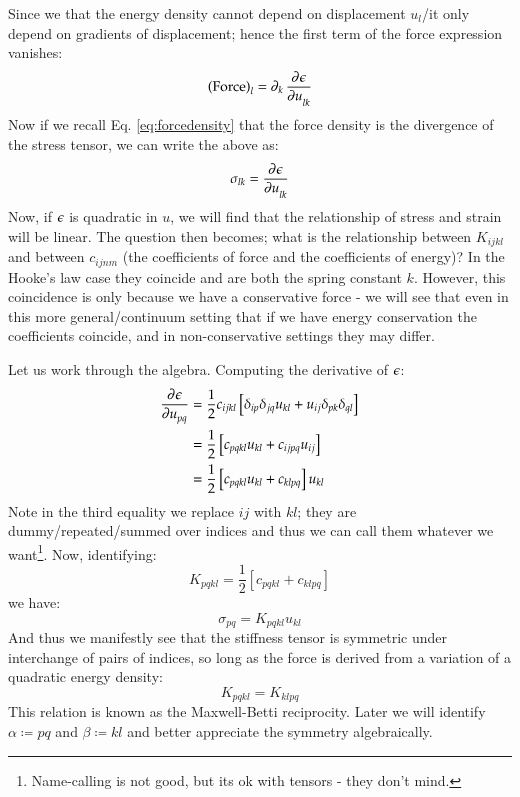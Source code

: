 Since we that the energy density cannot depend on displacement $u_l$/it only depend on gradients of displacement; hence the first term of the force expression vanishes:
\begin{equation}
    \left(\text{Force}\right)_l = \p_k \dpd{\e}{u_{lk}}
\end{equation}
Now if we recall Eq. \eqref{eq:forcedensity} that the force density is the divergence of the stress tensor, we can write the above as:
\begin{equation}
    \sigma_{lk} = \dpd{\e}{u_{lk}}
\end{equation}
Now, if $\epsilon$ is quadratic in $u$, we will find that the relationship of stress and strain will be linear. The question then becomes; what is the relationship between $K_{ijkl}$ and between $c_{ijnm}$ (the coefficients of force and the coefficients of energy)? In the Hooke's law case they coincide and are both the spring constant $k$. However, this coincidence is only because we have a conservative force - we will see that even in this more general/continuum setting that if we have energy conservation the coefficients coincide, and in non-conservative settings they may differ.

Let us work through the algebra. Computing the derivative of $\epsilon$:
\begin{equation}
    \begin{split}
        \dpd{\e}{u_{pq}} &= \frac{1}{2}c_{ijkl}\left[\delta_{ip}\delta_{jq}u_{kl} + u_{ij}\delta_{pk}\delta_{ql}\right] 
        \\ &= \frac{1}{2}\left[c_{pqkl}u_{kl} + c_{ijpq}u_{ij}\right]
        \\ &= \frac{1}{2}\left[c_{pqkl}u_{kl} + c_{klpq}\right]u_{kl}
    \end{split}
\end{equation}
Note in the third equality we replace $ij$ with $kl$; they are dummy/repeated/summed over indices and thus we can call them whatever we want\footnote{Name-calling is not good, but its ok with tensors - they don't mind.}. Now, identifying:
\begin{equation}
    K_{pqkl} = \frac{1}{2}[c_{pqkl} + c_{klpq}]
\end{equation}
we have:
\begin{equation}
    \sigma_{pq} = K_{pqkl}u_{kl}
\end{equation}
And thus we manifestly see that the stiffness tensor is symmetric under interchange of pairs of indices, so long as the force is derived from a variation of a quadratic energy density:
\begin{equation}
    \boxed{K_{pqkl} = K_{klpq}}
\end{equation}
This relation is known as the Maxwell-Betti reciprocity. Later we will identify $\alpha \coloneqq pq$ and $\beta \coloneqq kl$ and better appreciate the symmetry algebraically.

